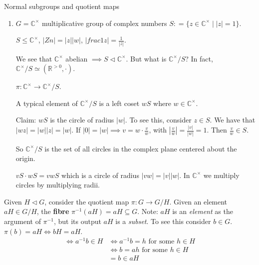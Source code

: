 \documentclass{article}
\begin{document}
\begin{cex}{Normal subgroups and quotient maps}{}
\begin{enumerate}
\begin{cpf}
                We claim $a^2 = 1 \text{ or } a$. $a^2 = a \implies a = 1$ which is not possible, so $a^2 = 1$. 
            \end{cpf}

        \item $G = \mathbb{C}^\times $ multiplicative group of complex numbers $S : = \{ z \in \mathbb{C}^\times \mid |z| = 1 \}$. 



            $S \leq \mathbb{C}^\times$, $ |Zn| = |z||w|$, $\left| frac 1z \right| = \frac{1}{\left| z \right|}$. 

            We see that $\mathbb{C}^\times$ abelian $\implies S \triangleleft \mathbb{C}^\times$. But what is $\mathbb{C}^\times / S$? In fact, $\mathbb{C}^\times / S \simeq \left( \mathbb{R}^{> 0 }, \cdot \right)$. 

            $ \pi : \mathbb{C}^\times \to \mathbb{C}^\times / S$. 

            A typical element of $ \mathbb{C}^\times / S$ is a left coset $wS$ where $w \in \mathbb{C}^\times$. 

            Claim: $wS$ is the circle of radius $|w|$. To see this, consider $z \in S$. We have that $|wz| = |w||z| = |w|$. If $|0| = |w| \implies v = w \cdot \frac vw$, with $\left| \frac{v}{w} \right| = \frac{|v|}{|w|} = 1$. Then $\frac vw \in S$. 

            So $\mathbb{C}^\times / S $ is the set of all circles in the complex plane centered about the origin. 

            $vS \cdot wS = vwS$ which is a circle of radius $|vw| = |v||w|$. In $\mathbb{C}^\times$ we multiply circles by multiplying radii. 

    \end{enumerate}
\end{cex}

Given $ H \triangleleft G$, consider the quotient map $ \pi : G \to G/H$. Given an element $aH \in G/H$, the \textbf{fibre} $\pi^{-1}(aH) = aH \subseteq G$. Note: $aH$ is an \textit{element} as the argument of $\pi^{-1}$, but its output $aH$ is a \textit{subset}. To see this consider $b \in G$. $\pi(b) = aH \iff bH = aH $. 
\begin{align*}
    \iff a^{-1}b \in H & \iff a^{-1}b = h \text{ for some $h \in H$}\\
    & \iff b = ah \text{ for some $h \in H$}\\
    & = b \in aH\\
\end{align*}
\end{document}
